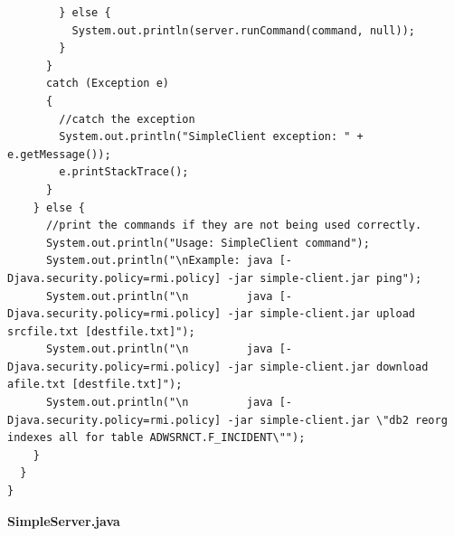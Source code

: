 \documentclass{article}
\begin{document}
\begin{lstlisting}
        } else {
          System.out.println(server.runCommand(command, null));
        }
      }
      catch (Exception e)
      {
        //catch the exception
        System.out.println("SimpleClient exception: " + e.getMessage());
        e.printStackTrace();
      }
    } else {
      //print the commands if they are not being used correctly.
      System.out.println("Usage: SimpleClient command");
      System.out.println("\nExample: java [-Djava.security.policy=rmi.policy] -jar simple-client.jar ping");
      System.out.println("\n         java [-Djava.security.policy=rmi.policy] -jar simple-client.jar upload srcfile.txt [destfile.txt]");
      System.out.println("\n         java [-Djava.security.policy=rmi.policy] -jar simple-client.jar download afile.txt [destfile.txt]");
      System.out.println("\n         java [-Djava.security.policy=rmi.policy] -jar simple-client.jar \"db2 reorg indexes all for table ADWSRNCT.F_INCIDENT\"");
    }
  }
}

\end{lstlisting}

\textbf{SimpleServer.java}
\end{document}
